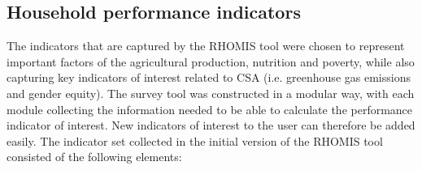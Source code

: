 \subsection{Household performance indicators}

The indicators that are captured by the RHOMIS tool were chosen to represent important factors of the agricultural production, nutrition and poverty, while also capturing key indicators of interest related to CSA (i.e. greenhouse gas emissions and gender equity). The survey tool was constructed in a modular way, with each module collecting the information needed to be able to calculate the performance indicator of interest. New indicators of interest to the user can therefore be added easily. The indicator set collected in the initial version of the RHOMIS tool consisted of the following elements:

